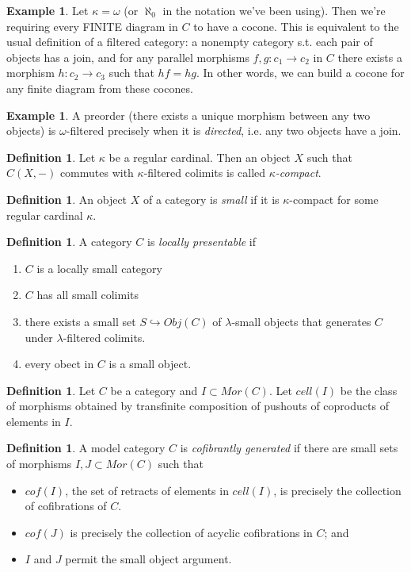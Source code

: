 \documentclass[letterpaper]{article}
\theoremstyle{definition}
\newtheorem{example}[lemma]{Example}
\newtheorem{definition}[lemma]{Definition}
\begin{document}
\begin{example}
Let $\kappa = \omega$ (or $\aleph_0$ in the notation we've been
using). Then we're requiring every FINITE diagram in $C$ to have a
cocone. This is equivalent to the usual definition of a filtered
category: a nonempty category s.t. each pair of objects has a join,
and for any parallel morphisms $f,g: c_1 \rightarrow c_2$ in $C$ there
exists a morphism $h : c_2 \rightarrow c_3$ such that $hf = hg$. In
other words, we can build a cocone for any finite diagram from these cocones.
\end{example}

\begin{example}
A preorder (there exists a unique morphism between any two objects) is
$\omega$-filtered precisely when it is \emph{directed}, i.e. any two objects
have a join.
\end{example}

\begin{definition}
Let $\kappa$ be a regular cardinal. Then an object $X$ such that
$C(X,-)$ commutes with $\kappa$-filtered colimits is called \emph{$\kappa$-compact}.
\end{definition}

\begin{definition}
An object $X$ of a category is \emph{small} if it is $\kappa$-compact
for some regular cardinal $\kappa$.
\end{definition}

\begin{definition}
A category $C$ is \emph{locally presentable} if 
\begin{enumerate}
\item $C$ is a locally small category
\item $C$ has all small colimits
\item there exists a small set $S\hookrightarrow Obj(C)$ of
  $\lambda$-small objects that generates $C$ under $\lambda$-filtered
  colimits.
\item every obect in $C$ is a small object.
\end{enumerate}
\end{definition}

\begin{definition}
Let $C$ be a category and $I \subset Mor(C)$. Let \emph{$cell(I)$} be
  the class of morphisms obtained by transfinite composition of
  pushouts of coproducts of elements in $I$.
\end{definition}

\begin{definition}
A model category $C$ is \emph{cofibrantly generated} if there are
small sets of morphisms $I,J \subset Mor(C)$ such that
\begin{itemize}
\item $cof(I)$, the set of retracts of elements in $cell(I)$, is
  precisely the collection of cofibrations of $C$.
\item $cof(J)$ is precisely the collection of acyclic cofibrations in
  $C$; and
\item $I$ and $J$ permit the small object argument. 
\end{itemize}
\end{definition}
\end{document}
